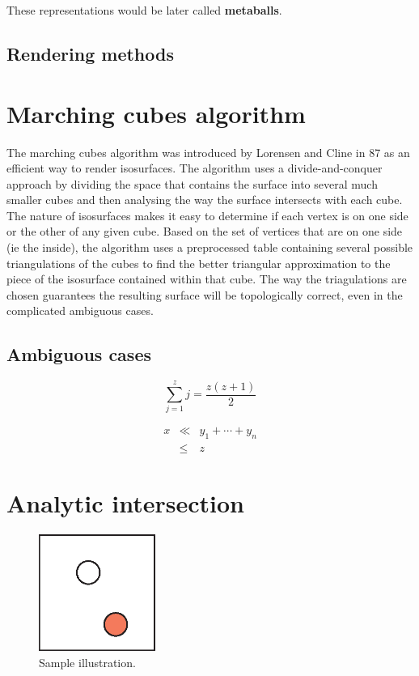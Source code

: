 \documentclass[conference]{acmsiggraph}
\begin{document}
These representations
would be later called \textbf{metaballs}.

\subsection{Rendering methods}

\section{Marching cubes algorithm}

The marching cubes algorithm was introduced by Lorensen and Cline in 87 as an efficient way to render isosurfaces. The algorithm uses a divide-and-conquer approach by dividing the space that contains the surface into several much smaller cubes and then analysing the way the surface intersects with each cube. The nature of isosurfaces makes it easy to determine if each vertex is on one side or the other of any given cube. Based on the set of vertices that are on one side (ie the inside), the algorithm uses a preprocessed table containing several possible triangulations of the cubes to find the better triangular approximation to the piece of the isosurface contained within that cube. The way the triagulations are chosen guarantees the resulting surface will be topologically correct, even in the complicated ambiguous cases. 






\subsection{Ambiguous cases}

\begin{equation}
 \sum_{j=1}^{z} j = \frac{z(z+1)}{2}
\end{equation}

\begin{eqnarray}
x & \ll & y_{1} + \cdots + y_{n} \\
  & \leq & z
\end{eqnarray}

\section{Analytic intersection}


\begin{figure}[ht]
  \centering
  \includegraphics[width=1.5in]{images/samplefigure}
  \caption{Sample illustration.}
\end{figure}
\end{document}

